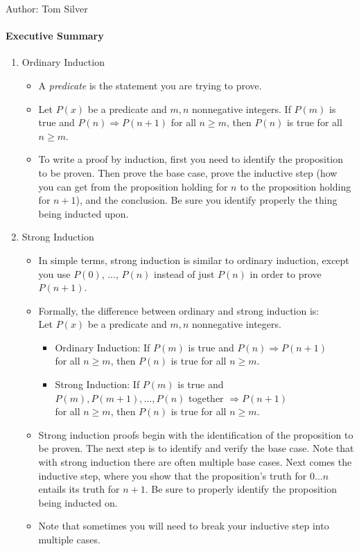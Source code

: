 \documentclass[solution, letterpaper]{cs20inclass}
\begin{document}

\noindent Author: Tom Silver%


\paragraph*{Executive Summary}

\begin{enumerate}

\item Ordinary Induction
\begin{itemize}
\item A {\em predicate} is the statement you are trying to prove.
\item Let $P(x)$ be a predicate and $m, n$ nonnegative integers.  If $P(m)$ is true and $P(n) \Rightarrow P(n+1)$ for all $n \ge m$, then $P(n)$ is true for all $n \ge m$.

\item To write a proof by induction, first you need to identify the proposition to be proven.  Then prove the base case, prove the inductive step (how you can get from the proposition holding for $n$ to the proposition holding for $n+1$), and the conclusion.  Be sure you identify properly the thing being inducted upon.
\end{itemize}

\item Strong Induction
\begin{itemize}
\item In simple terms, strong induction is similar to ordinary induction, except you use $P(0)$, $\ldots$, $P(n)$ instead of just $P(n)$ in order to prove $P(n+1)$.
\item Formally, the difference between ordinary and strong induction is:\\
Let $P(x)$ be a predicate and $m,n$ nonnegative integers.
    \begin{itemize}
    \item Ordinary Induction: If $P(m)$ is true and $P(n) \Rightarrow P(n+1)$\\ for all $n \geq m$, then $P(n)$ is true for all $n      \geq m$.
    \item Strong Induction: If $P(m)$ is true and\\ $P(m), P(m+1), \dots, P(n)$ together $\Rightarrow P(n+1)$\\
    for all $n \geq m$, then $P(n)$ is true for all $n \geq m$.
    \end{itemize}
\item Strong induction proofs begin with the identification of the proposition to be proven. The next step is to identify and verify the base case. Note that with strong induction there are often multiple base cases. Next comes the inductive step, where you show that the proposition's truth for $0\ldots n$ entails its truth for $n+1$. Be sure to properly identify the proposition being inducted on.  
\item Note that sometimes you will need to break your inductive step into multiple cases.
\end{itemize}
\end{enumerate}
\end{document}
